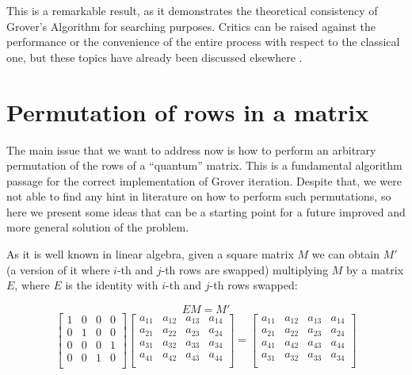 \bigskip

This is a remarkable result, as it demonstrates the theoretical consistency of Grover's Algorithm for searching purposes. Critics can be raised against the performance or the convenience of the entire process with respect to the classical one, but these topics have already been discussed elsewhere \cite{1425397}.

\section{Permutation of rows in a matrix}
\label{sec:permutation}

The main issue that we want to address now is how to perform an arbitrary permutation of the rows of a ``quantum'' matrix. This is a fundamental algorithm passage for the correct implementation of Grover iteration. Despite that, we were not able to find any hint in literature on how to perform such permutations, so here we present some ideas that can be a starting point for a future improved and more general solution of the problem.

\bigskip

As it is well known in linear algebra, given a square matrix $M$ we can obtain $M'$ (a version of it where $i$-th and $j$-th rows are swapped) multiplying $M$ by a matrix $E$, where $E$ is the identity with $i$-th and $j$-th rows swapped:

\begin{equation*}
E M = M'
\end{equation*}
\begin{equation*}
	\begin{bmatrix}
	1 & 0 & 0 & 0\\
	0 & 1 & 0 & 0\\
	0 & 0 & 0 & 1\\
	0 & 0 & 1 & 0\\
	\end{bmatrix}
	\begin{bmatrix}
	a_{11} & a_{12} & a_{13} & a_{14}\\
	a_{21} & a_{22} & a_{23} & a_{24}\\
	a_{31} & a_{32} & a_{33} & a_{34}\\
	a_{41} & a_{42} & a_{43} & a_{44}\\
	\end{bmatrix}
	=
	\begin{bmatrix}
	a_{11} & a_{12} & a_{13} & a_{14}\\
	a_{21} & a_{22} & a_{23} & a_{24}\\
	a_{41} & a_{42} & a_{43} & a_{44}\\
	a_{31} & a_{32} & a_{33} & a_{34}\\
	\end{bmatrix}
\end{equation*}


